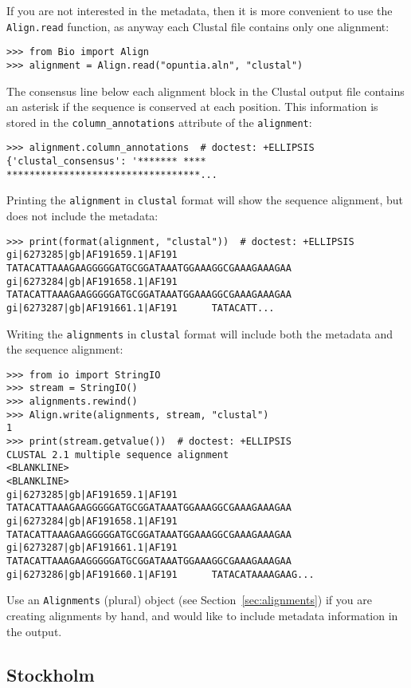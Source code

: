 If you are not interested in the metadata, then it is more convenient to use the \verb|Align.read| function, as anyway each Clustal file contains only one alignment:
\begin{verbatim}
>>> from Bio import Align
>>> alignment = Align.read("opuntia.aln", "clustal")
\end{verbatim}
The consensus line below each alignment block in the Clustal output file contains an asterisk if the sequence is conserved at each position. This information is stored in the \verb|column_annotations| attribute of the \verb|alignment|:
\begin{verbatim}
>>> alignment.column_annotations  # doctest: +ELLIPSIS
{'clustal_consensus': '******* **** **********************************...
\end{verbatim}
Printing the \verb|alignment| in \verb|clustal| format will show the sequence alignment, but does not include the metadata:
\begin{verbatim}
>>> print(format(alignment, "clustal"))  # doctest: +ELLIPSIS
gi|6273285|gb|AF191659.1|AF191      TATACATTAAAGAAGGGGGATGCGGATAAATGGAAAGGCGAAAGAAAGAA
gi|6273284|gb|AF191658.1|AF191      TATACATTAAAGAAGGGGGATGCGGATAAATGGAAAGGCGAAAGAAAGAA
gi|6273287|gb|AF191661.1|AF191      TATACATT...
\end{verbatim}
Writing the \verb|alignments| in \verb|clustal| format will include both the metadata and the sequence alignment:
\begin{verbatim}
>>> from io import StringIO
>>> stream = StringIO()
>>> alignments.rewind()
>>> Align.write(alignments, stream, "clustal")
1
>>> print(stream.getvalue())  # doctest: +ELLIPSIS
CLUSTAL 2.1 multiple sequence alignment
<BLANKLINE>
<BLANKLINE>
gi|6273285|gb|AF191659.1|AF191      TATACATTAAAGAAGGGGGATGCGGATAAATGGAAAGGCGAAAGAAAGAA
gi|6273284|gb|AF191658.1|AF191      TATACATTAAAGAAGGGGGATGCGGATAAATGGAAAGGCGAAAGAAAGAA
gi|6273287|gb|AF191661.1|AF191      TATACATTAAAGAAGGGGGATGCGGATAAATGGAAAGGCGAAAGAAAGAA
gi|6273286|gb|AF191660.1|AF191      TATACATAAAAGAAG...
\end{verbatim}
Use an \verb|Alignments| (plural) object (see Section~\ref{sec:alignments}) if you are creating alignments by hand, and would like to include metadata information in the output.

\subsection{Stockholm}
\label{subsec:align_stockholm}


